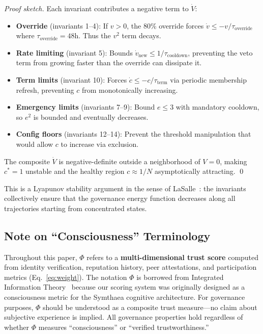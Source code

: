 \documentclass[11pt,a4paper]{article}
\begin{document}
\begin{proof}[Proof sketch]
Each invariant contributes a negative term to $\dot{V}$:
\begin{itemize}
    \item \textbf{Override} (invariants 1--4): If $v > 0$, the 80\% override forces $\dot{v} \leq -v/\tau_{\text{override}}$ where $\tau_{\text{override}} = 48\text{h}$. Thus the $v^2$ term decays.
    \item \textbf{Rate limiting} (invariant 5): Bounds $\dot{v}_{\text{new}} \leq 1/\tau_{\text{cooldown}}$, preventing the veto term from growing faster than the override can dissipate it.
    \item \textbf{Term limits} (invariant 10): Forces $\dot{c} \leq -c/\tau_{\text{term}}$ via periodic membership refresh, preventing $c$ from monotonically increasing.
    \item \textbf{Emergency limits} (invariants 7--9): Bound $e \leq 3$ with mandatory cooldown, so $e^2$ is bounded and eventually decreases.
    \item \textbf{Config floors} (invariants 12--14): Prevent the threshold manipulation that would allow $c$ to increase via exclusion.
\end{itemize}
The composite $\dot{V}$ is negative-definite outside a neighborhood of $V = 0$, making $c^* = 1$ unstable and the healthy region $c \approx 1/N$ asymptotically attracting. \qed
\end{proof}

\noindent This is a Lyapunov stability argument in the sense of LaSalle~\cite{lasalle}: the invariants collectively ensure that the governance energy function decreases along all trajectories starting from concentrated states.

\subsection{Note on ``Consciousness'' Terminology}
\label{sec:phi_note}

Throughout this paper, $\Phi$ refers to a \textbf{multi-dimensional trust score} computed from identity verification, reputation history, peer attestations, and participation metrics (Eq.~\ref{eq:weight}). The notation $\Phi$ is borrowed from Integrated Information Theory~\cite{tononi} because our scoring system was originally designed as a consciousness metric for the Symthaea cognitive architecture. For governance purposes, $\Phi$ should be understood as a composite trust measure---no claim about subjective experience is implied. All governance properties hold regardless of whether $\Phi$ measures ``consciousness'' or ``verified trustworthiness.''
\end{document}
